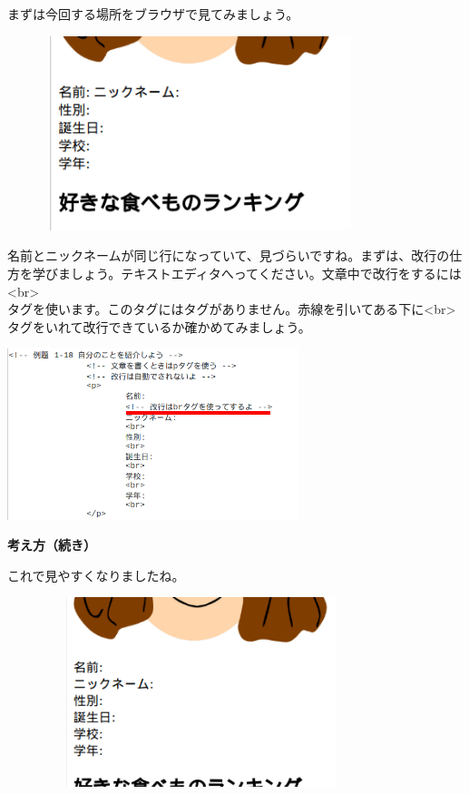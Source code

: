\documentclass[a4paper,12pt]{jarticle}
\begin{document}
\bigskip

まずは今回する場所をブラウザで見てみましょう。

\centering
\includegraphics[width=11.28cm,height=5.667cm]{textbook-img175.png}

\bigskip

\flushleft
名前とニックネームが同じ行になっていて、見づらいですね。まずは、改行の仕方を学びましょう。テキストエディタへってください。文章中で改行をするには\\
{\textless}br{\textgreater} \ \ \ \ \ \\
タグを使います。このタグにはタグがありません。赤線を引いてある下に{\textless}br{\textgreater}タグをいれて改行できているか確かめてみましょう。


\centering
\includegraphics[width=8.504cm,height=4.983cm]{textbook-img174.png}

\clearpage
\flushleft

\textbf{考え方（続き）}


これで見やすくなりましたね。

\bigskip


\includegraphics[width=11.28cm,height=5.526cm]{textbook-img176.png}
\end{document}
